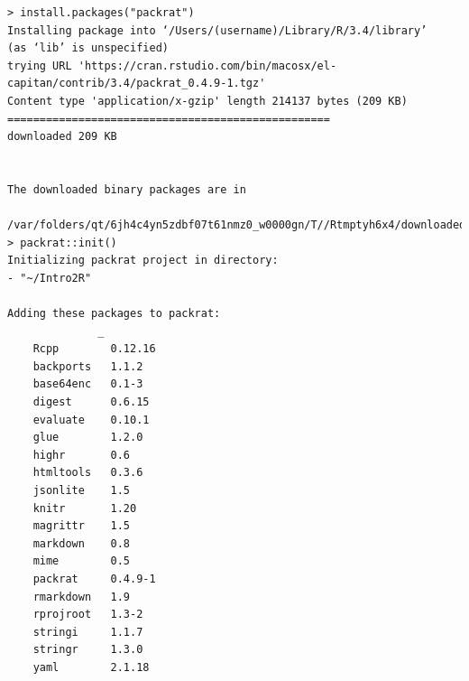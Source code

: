 \documentclass[]{book}
\theoremstyle{definition}
\theoremstyle{definition}
\theoremstyle{definition}
\theoremstyle{remark}
\begin{document}
\begin{verbatim}
> install.packages("packrat")
Installing package into ‘/Users/(username)/Library/R/3.4/library’
(as ‘lib’ is unspecified)
trying URL 'https://cran.rstudio.com/bin/macosx/el-capitan/contrib/3.4/packrat_0.4.9-1.tgz'
Content type 'application/x-gzip' length 214137 bytes (209 KB)
==================================================
downloaded 209 KB


The downloaded binary packages are in
    /var/folders/qt/6jh4c4yn5zdbf07t61nmz0_w0000gn/T//Rtmptyh6x4/downloaded_packages
> packrat::init()
Initializing packrat project in directory:
- "~/Intro2R"

Adding these packages to packrat:
              _        
    Rcpp        0.12.16
    backports   1.1.2  
    base64enc   0.1-3  
    digest      0.6.15 
    evaluate    0.10.1 
    glue        1.2.0  
    highr       0.6    
    htmltools   0.3.6  
    jsonlite    1.5    
    knitr       1.20   
    magrittr    1.5    
    markdown    0.8    
    mime        0.5    
    packrat     0.4.9-1
    rmarkdown   1.9    
    rprojroot   1.3-2  
    stringi     1.1.7  
    stringr     1.3.0  
    yaml        2.1.18 


\end{verbatim}
\end{document}
